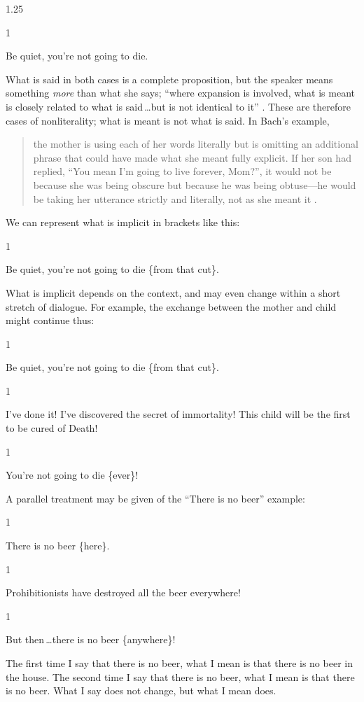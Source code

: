 \documentclass[12pt,twoside]{reedfancy}
\newcommand{\stage}[3]%
{%
	\begin{spacing}{1}%
	\vspace{0pt}
		\begin{description}[style=nextline, parsep=0pt,
                    leftmargin=15mm, itemindent=-10mm, font=\mdseries]
			\item[\textsc{#1} \emph{#2}] #3
		\end{description}%
	\end{spacing}%
}
\begin{document}
\begin{spacing}{1.25}
\stage{Mother}{(treating her child's cut)}{Be quiet, you're not going
to die.}

What is said in both cases is a complete proposition, but the speaker
means something {\em more} than what she says; ``where expansion is
involved, what is meant is closely related to what is said\,\ldots but
is not identical to it'' \citep{bach1994}.  These are therefore cases
of nonliterality; what is meant is not what is said.  In Bach's
example,

\begin{quote}
the mother is using each of her words literally but is omitting an
additional phrase that could have made what she meant fully explicit.
If her son had replied, ``You mean I'm going to live forever, Mom?'',
it would not be because she was being obscure but because he was being
obtuse---he would be taking her utterance strictly and literally, not
as she meant it \citeyearpar{bach1994}.
\end{quote}

We can represent what is implicit in brackets like this:

\stage{Mother}{(treating her child's cut)}{Be quiet, you're not going
to die \{from that cut\}.}

\noindent What is implicit depends on the context, and may even change
within a short stretch of dialogue.  For example, the exchange between
the mother and child might continue thus:

\stage{Mother}{(treating her child's cut)}{Be quiet, you're not going
  to die \{from that cut\}.}

\stage{Scientist}{(runs in)}{I've done it!  I've discovered the secret
  of immortality!  This child will be the first to be cured of Death!}

\stage{Mother}{(to her child)}{You're not going to die \{ever\}!}

A parallel treatment may be given of the ``There is no beer'' example:

\stage{Me}{}{There is no beer \{here\}.}

\stage{Lauren}{(enters)}{Prohibitionists have destroyed all the beer
  everywhere!}

\stage{Me}{(horror-struck)}{But then\,\ldots there is no beer
  \{anywhere\}!}

The first time I say that there is no beer, what I mean is that there
is no beer in the house.  The second time I say that there is no beer,
what I mean is that there is no beer.  What I say does not change, but
what I mean does.


\end{spacing}
\end{document}
